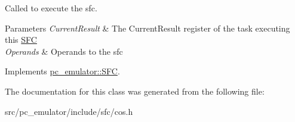 Called to execute the sfc. 


\begin{DoxyParams}{Parameters}
{\em Current\+Result} & The Current\+Result register of the task executing this \hyperlink{classpc__emulator_1_1SFC}{S\+FC} \\
\hline
{\em Operands} & Operands to the sfc \\
\hline
\end{DoxyParams}


Implements \hyperlink{classpc__emulator_1_1SFC_ab206c80fc0e429c56672b4f6a0ca8635}{pc\+\_\+emulator\+::\+S\+FC}.



The documentation for this class was generated from the following file\+:\begin{DoxyCompactItemize}
\item 
src/pc\+\_\+emulator/include/sfc/cos.\+h\end{DoxyCompactItemize}
